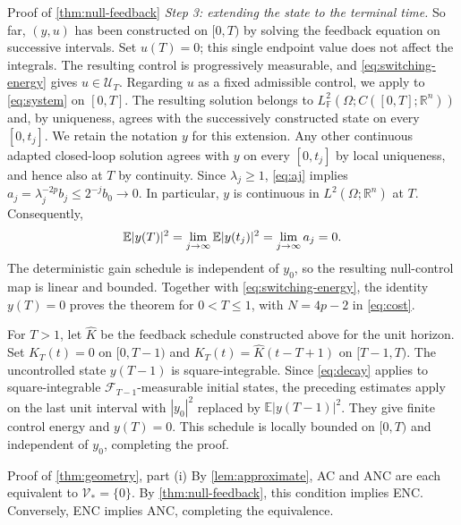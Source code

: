 \documentclass[twocolumn]{autart}
\newcounter{part}
\begin{document}
\begin{pf*}{Proof of \cref{thm:null-feedback}}
\emph{Step 3: extending the state to the terminal time.}
So far, $(y,u)$ has been constructed on $[0,T)$ by solving the
feedback equation on successive intervals. Set $u(T)=0$; this
single endpoint value does not affect the integrals.
The resulting control is progressively measurable, and
\cref{eq:switching-energy} gives $u\in\mathcal U_T$.
Regarding $u$ as a fixed admissible control, we apply
\cite[Theorem~3.2, p.~132]{Lue2021a} to \cref{eq:system} on $[0,T]$.
The resulting solution belongs to
$L^2_{\mathbb F}(\Omega;C([0,T];\mathbb R^n))$ and, by uniqueness,
agrees with the successively constructed state on every $[0,t_j]$.
We retain the notation $y$ for this extension.
Any other continuous adapted closed-loop solution agrees with $y$
on every $[0,t_j]$ by local uniqueness, and hence also at $T$
by continuity. Since $\lambda_j\geq1$, \cref{eq:aj} implies
$
a_j=\lambda_j^{-2p}b_j\leq2^{-j}b_0\longrightarrow0.
$
In particular, $y$ is continuous in $L^2(\Omega;\mathbb R^n)$
at $T$. Consequently,\vspace{-2mm}
\begin{equation*}
\mathbb E|y(T)|^2=\lim_{j\to\infty}\mathbb E|y(t_j)|^2
=\lim_{j\to\infty}a_j=0.\vspace{-2mm}
\end{equation*}
The deterministic gain schedule is independent of $y_0$, so the
resulting null-control map is linear and bounded. Together with
\cref{eq:switching-energy}, the identity $y(T)=0$ proves the theorem for
$0<T\leq1$, with $N=4p-2$ in \cref{eq:cost}.

For $T>1$, let $\widehat K$ be the feedback schedule constructed above
for the unit horizon. Set $K_T(t)=0$ on $[0,T-1)$ and
$K_T(t)=\widehat K(t-T+1)$ on $[T-1,T)$. The uncontrolled state
$y(T-1)$ is square-integrable. Since \cref{eq:decay} applies to
square-integrable $\mathcal F_{T-1}$-measurable initial states, the
preceding estimates apply on the last unit interval with $|y_0|^2$
replaced by $\mathbb E|y(T-1)|^2$. They give finite control energy and
$y(T)=0$. This schedule is locally bounded on $[0,T)$ and independent
of $y_0$, completing the proof.
\end{pf*}

\vspace{-4mm}

\begin{pf*}{Proof of \cref{thm:geometry}, part \textup{(i)}}
By \cref{lem:approximate}, AC and ANC are each equivalent to
$\mathcal V_*=\{0\}$. By \cref{thm:null-feedback}, this condition implies
ENC. Conversely, ENC implies ANC, completing the equivalence.
\end{pf*}
\end{document}
